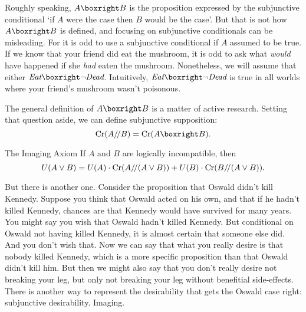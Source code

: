 {  Roughly speaking, $A \boxright B$ is the proposition expressed by
  the subjunctive conditional `if $A$ were the case then $B$ would be
  the case'. But that is not how $A \boxright B$ is defined, and
  focusing on subjunctive conditionals can be misleading. For it is
  odd to use a subjunctive conditional if $A$ assumed to be true. If
  we know that your friend did eat the mushroom, it is odd to ask what
  \emph{would} have happened if she \emph{had} eaten the
  mushroom. Nonetheless, we will assume that either $\emph{Eat}
  \boxright \neg \emph{Dead}$. Intuitively, $\emph{Eat} \boxright \neg
  \emph{Dead}$ is true in all worlds where your friend's mushroom
  wasn't poisonous.

  The general definition of $A \boxright B$ is a matter of active
  research.%
  Setting that question aside, we can define subjunctive supposition:
  \[
  \Cr(A/\!/B) = \Cr(A \boxright B).
  \]
  
  
  \begin{genericthm}{The Imaging Axiom}
    If $A$ and $B$ are logically incompatible, then 
    \[ U(A \lor B) =
    U(A)\cdot \text{Cr}(A/\!/(A\lor B)) + U(B)\cdot \text{Cr}(B/\!/(A \lor B)). \]
  \end{genericthm}
  
  But there is another one. Consider the proposition that Oswald
  didn't kill Kennedy. Suppose you think that Oswald acted on his own,
  and that if he hadn't killed Kennedy, chances are that Kennedy would
  have survived for many years. You might say you wish that Oswald
  hadn't killed Kennedy. But conditional on Oswald not having killed
  Kennedy, it is almost certain that someone else did. And you don't
  wish that. Now we can say that what you really desire is that nobody
  killed Kennedy, which is a more specific proposition than that
  Oswald didn't kill him. But then we might also say that you don't
  really desire not breaking your leg, but only not breaking your leg
  without benefitial side-effects. There is another way to represent
  the desirability that gets the Oswald case right: subjunctive
  desirability. Imaging.


}

